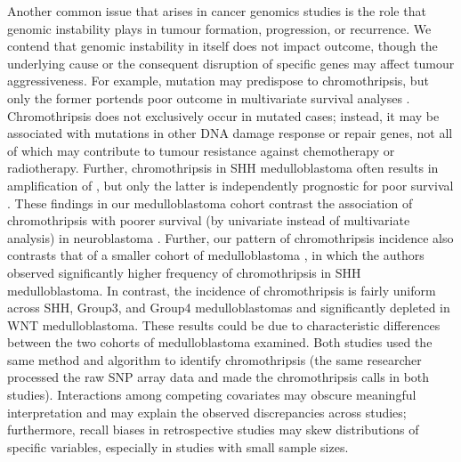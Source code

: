 Another common issue that arises in cancer genomics studies is the role that genomic instability plays in tumour formation, progression, or recurrence. We contend that genomic instability in itself does not impact outcome, though the underlying cause or the consequent disruption of specific genes may affect tumour aggressiveness. For example,  mutation may predispose to chromothripsis, but only the former portends poor outcome in multivariate survival analyses . Chromothripsis does not exclusively occur in  mutated cases; instead, it may be associated with mutations in other DNA damage response or repair genes, not all of which may contribute to tumour resistance against chemotherapy or radiotherapy. Further, chromothripsis in SHH medulloblastoma often results in amplification of , but only the latter is independently prognostic for poor survival . These findings in our medulloblastoma cohort contrast the association of chromothripsis with poorer survival (by univariate instead of multivariate analysis) in neuroblastoma . Further, our pattern of chromothripsis incidence also contrasts that of a smaller cohort of medulloblastoma , in which the authors observed significantly higher frequency of chromothripsis in SHH medulloblastoma. In contrast, the incidence of chromothripsis is fairly uniform across SHH, Group3, and Group4 medulloblastomas and significantly depleted in WNT medulloblastoma. These results could be due to characteristic differences between the two cohorts of medulloblastoma examined. Both studies used the same method and algorithm to identify chromothripsis (the same researcher processed the raw SNP array data and made the chromothripsis calls in both studies). Interactions among competing covariates may obscure meaningful interpretation and may explain the observed discrepancies across studies; furthermore, recall biases in retrospective studies may skew distributions of specific variables, especially in studies with small sample sizes.

